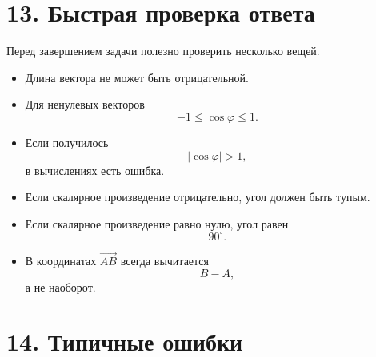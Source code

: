 \documentclass[a4paper,12pt]{article}
\newcommand{\vect}[1]{\overrightarrow{#1}}
\begin{document}

\section*{\color{darkaccent}13. Быстрая проверка ответа}

Перед завершением задачи полезно проверить несколько вещей.

\begin{itemize}
    \item Длина вектора не может быть отрицательной.
    \item Для ненулевых векторов
    \[
    -1\le\cos\varphi\le1.
    \]
    \item Если получилось
    \[
    |\cos\varphi|>1,
    \]
    в вычислениях есть ошибка.
    \item Если скалярное произведение отрицательно, угол должен быть тупым.
    \item Если скалярное произведение равно нулю, угол равен
    \[
    90^\circ.
    \]
    \item В координатах \(\vect{AB}\) всегда вычитается
    \[
    B-A,
    \]
    а не наоборот.
\end{itemize}


\section*{\color{darkaccent}14. Типичные ошибки}
\end{document}
